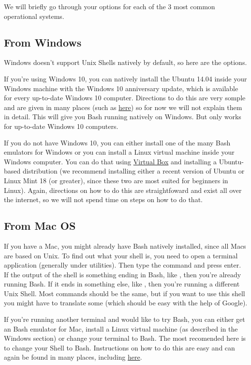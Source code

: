 \documentclass[letterpaper,10pt,openany,oneside]{sphinxmanual}
\begin{document}
We will briefly go through your options for each of the 3 most common
operational systems.


\subsection{From Windows}
\label{bash:from-windows}
Windows doesn't support Unix Shells natively by default, so here are the
options.

If you're using Windows 10, you can natively install the Ubuntu 14.04 inside
your Windows machine with the Windows 10 anniversary update, which is available
for every up-to-date Windows 10 computer. Directions to do this are very somple
and are given in many places (such as \href{http://www.howtogeek.com/249966/how-to-install-and-use-the-linux-bash-shell-on-windows-10/}{here})
so for now we will not explain them in detail. This will give you Bash running
natively on Windows. But only works for up-to-date Windows 10 computers.

If you do not have Windows 10, you can either install one of the many Bash
emulators for Windows or you can install a Linux virtual machine inside your
Windows computer.  You can do that using \href{https://www.virtualbox.org/wiki/Downloads}{Virtual Box} and installing a Ubuntu-based
distribution (we recommend installing either a recent version of Ubuntu or
Linux Mint 18 (or greater), since these two are most suited for beginners in
Linux). Again, directions on how to do this are straightfoward and exist all
over the internet, so we will not spend time on steps on how to do that.


\subsection{From Mac OS}
\label{bash:from-mac-os}
If you have a Mac, you might already have Bash natively installed, since all
Macs are based on Unix. To find out what your shell is, you need to open a
terminal application (generally under utilities). Then type the command  and press enter. If the output of the shell is something ending in
Bash, like , then you're already running Bash. If it ends in
something else, like , then you're running a different Unix Shell.
Most commands should be the same, but if you want to use this shell you might
have to translate some (which should be easy with the help of Google).

If you're running another terminal and would like to try Bash, you can either
get an Bash emulator for Mac, install a Linux virtual machine (as described in
the Windows section) or change your terminal to Bash. The most recomended here
is to change your Shell to Bash. Instructions on how to do this are easy and
can again be found in many places, including \href{http://osxdaily.com/2012/03/21/change-shell-mac-os-x/}{here}.
\end{document}
